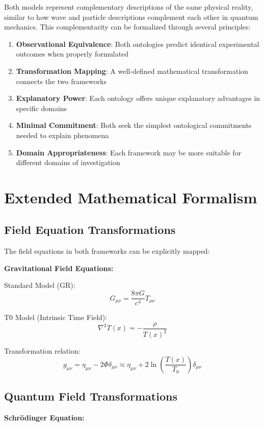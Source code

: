 \documentclass[12pt,a4paper]{article}
\newcommand{\Tfield}{T(x)}
\newcommand{\Tzero}{T_0}
\begin{document}
	Both models represent complementary descriptions of the same physical reality, similar to how wave and particle descriptions complement each other in quantum mechanics. This complementarity can be formalized through several principles:
	
	\begin{enumerate}
		\item \textbf{Observational Equivalence}: Both ontologies predict identical experimental outcomes when properly formulated
		\item \textbf{Transformation Mapping}: A well-defined mathematical transformation connects the two frameworks
		\item \textbf{Explanatory Power}: Each ontology offers unique explanatory advantages in specific domains
		\item \textbf{Minimal Commitment}: Both seek the simplest ontological commitments needed to explain phenomena
		\item \textbf{Domain Appropriateness}: Each framework may be more suitable for different domains of investigation
	\end{enumerate}
	
	\section{Extended Mathematical Formalism}
	
	\subsection{Field Equation Transformations}
	
	The field equations in both frameworks can be explicitly mapped:
	
	\textbf{Gravitational Field Equations:}
	
	Standard Model (GR):
	$$G_{\mu\nu} = \frac{8\pi G}{c^4}T_{\mu\nu}$$
	
	T0 Model (Intrinsic Time Field):
	$$\nabla^2 \Tfield = -\frac{\rho}{\Tfield^2}$$
	
	Transformation relation:
	$$g_{\mu\nu} = \eta_{\mu\nu} - 2\Phi\delta_{\mu\nu} \approx \eta_{\mu\nu} + 2\ln\left(\frac{\Tfield}{\Tzero}\right)\delta_{\mu\nu}$$
	
	\subsection{Quantum Field Transformations}
	
	\textbf{Schrödinger Equation:}
	
\end{document}
